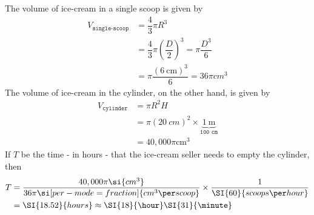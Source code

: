 \begin{solution}
	The volume of ice-cream in a single scoop is given by
	\begin{align}
		V_{\texttt{single-scoop}} &= \dfrac{4}{3}\pi R^3 \\
		                 &= \dfrac{4}{3}\pi(\dfrac{D}{2})^3 = \pi\dfrac{D^3}{6} \\
		                 &= \pi\dfrac{(\SI{6}{\centi\meter})^3}{6} = 36\pi\si{cm^3}
	\end{align}
	The volume of ice-cream in the cylinder, on the other hand, is given by
	\begin{align}
		V_{\texttt{cylinder}} &= \pi R^2 H \\
		                      &= \pi(\SI{20}{cm})^2\times\underbrace{\SI{1}{\meter}}_{\texttt{100 cm}} \\
		                      &= 40,000\pi\si{\centi\meter}^3
	\end{align} 
	If $T$ be the time - in hours - that the ice-cream seller needs to empty the cylinder, then
	\begin{align}
		T &= \dfrac{40,000\pi\si{cm^3}}{36\pi\si[per-mode=fraction]{cm^3\per scoop}}
		     \times \dfrac{1}{\SI{60}{scoops\per hour}} \\
		  &= \SI{18.52}{hours}\approx \SI{18}{\hour}\SI{31}{\minute}
	\end{align}
\end{solution}

